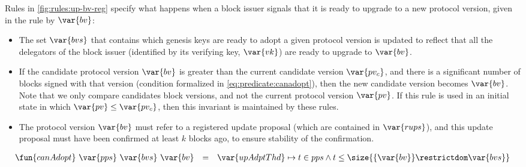 Rules in \cref{fig:rules:up-bv-reg} specify what happens when a block issuer
signals that it is ready to upgrade to a new protocol version, given in the
rule by $\var{bv}$:
\begin{itemize}
\item The set $\var{bvs}$ that contains which genesis keys are ready to adopt
  a given protocol version is updated to reflect that all the delegators of the
  block issuer (identified by its verifying key, $\var{vk}$) are ready to
  upgrade to $\var{bv}$.
\item If the candidate protocol version $\var{bv}$ is greater than the current
  candidate version $\var{pv_c}$, and there is a significant number of blocks
  signed with that version (condition formalized in
  \cref{eq:predicate:canadopt}), then the new candidate version becomes
  $\var{bv}$. Note that we only compare candidates block versions, and not the
  current protocol version $\var{pv}$. If this rule is used in an initial state
  in which $\var{pv} \leq \var{pv_c}$, then this invariant is maintained by
  these rules.
\item The protocol version $\var{bv}$ must refer to a registered update
  proposal (which are contained in $\var{rups}$), and this update proposal must
  have been confirmed at least $k$ blocks ago, to ensure stability of the
  confirmation.
\end{itemize}

\begin{equation}
  \label{eq:predicate:canadopt}
  \begin{array}{r c l}
    \fun{canAdopt}~\var{pps}~\var{bvs}~\var{bv}
    & =
    & \var{upAdptThd} \mapsto t \in pps \wedge
    t \leq \size{\{\var{bv}\} \restrictdom \var{bvs}}\\
  \end{array}
\end{equation}

